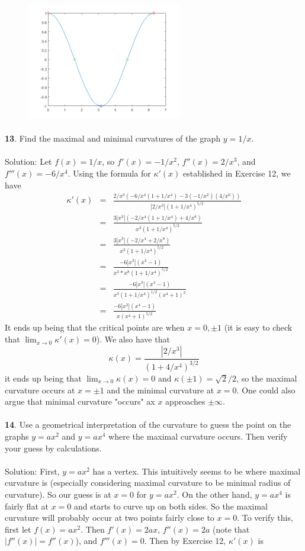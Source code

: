 \documentclass[12pt]{amsbook}
\begin{document}
\includegraphics[width=3.5in,height=2.0in]{2_14_12_2.png}
\\
\\
{\small\bf 13}. Find the maximal and minimal curvatures of the graph $y = 1/x$.
\\
\\
{\sc Solution}: Let $f(x)=1/x$, so $f'(x)=-1/x^2$, $f''(x)=2/x^3$, and $f'''(x)=-6/x^4$. Using the formula for $\kappa'(x)$ established in Exercise 12, we have 
\begin{eqnarray*}
\kappa'(x)&=&\frac{2/x^3(-6/x^4(1+1/x^4)-3(-1/x^2)(4/x^6))}{|2/x^3|(1+1/x^4)^{5/2}} \\
&=&\frac{3|x^3|(-2/x^4(1+1/x^4)+4/x^8)}{x^3(1+1/x^4)^{5/2}} \\
&=&\frac{3|x^3|(-2/x^4+2/x^8)}{x^3(1+1/x^4)^{5/2}} \\
&=&\frac{-6|x^3|(x^4-1)}{x^3*x^8(1+1/x^4)^{5/2}}\\
&=&\frac{-6|x^3|(x^4-1)}{x^3(1+1/x^4)^{1/2}(x^4+1)^2}\\
&=&\frac{-6|x^3|(x^4-1)}{x(x^4+1)^{5/2}}
\end{eqnarray*}
It ends up being that the critical points are when $x=0,\pm 1$ (it is easy to check that $\lim_{x\rightarrow 0}\kappa'(x)=0$). We also have that
$$\kappa(x)=\frac{|2/x^3|}{(1+4/x^4)^{3/2}}$$
it ends up being that $\lim_{x\rightarrow 0}\kappa(x)=0$ and $\kappa(\pm 1)=\sqrt{2}/2$, so the maximal curvature occurs at $x=\pm 1$ and the minimal curvature at $x=0$. One could also argue that minimal curvature "occurs" ax $x$ approaches $\pm \infty$. 
\\
\\
{\small\bf 14}. Use a geometrical interpretation of the curvature to guess the point on
the graphs $y=ax^2$ and $y = ax^4$ where the maximal curvature occurs. Then verify your guess by calculations.
\\
\\
{\sc Solution}: First, $y=ax^2$ has a vertex. This intuitively seems to be where maximal curvature is (especially considering maximal curvature to be minimal radius of curvature). So our guess is at $x=0$ for $y=ax^2$. On the other hand, $y=ax^4$ is fairly flat at $x=0$ and starts to curve up on both sides. So the maximal curvature will probably occur at two points fairly close to $x=0$. To verify this, first let $f(x)=ax^2$. Then $f'(x)=2ax$, $f''(x)=2a$ (note that $|f''(x)|=f''(x)$), and $f'''(x)=0$. Then by Exercise 12, $\kappa'(x)$ is
\end{document}

